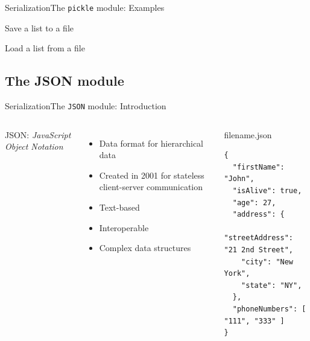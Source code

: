 \documentclass[10pt,compress]{beamer} %
\begin{document}
\begin{frame}[fragile]{Serialization}{The \texttt{pickle} module: Examples}
	\begin{exampleblock}{Save a list  to a file}
	\vspace{-0.2cm}
	
	\vspace{-0.2cm}
	\end{exampleblock}

	\begin{exampleblock}{Load a list from a file}
	\vspace{-0.2cm}
	
	\vspace{-0.2cm}
	\end{exampleblock}
\end{frame}

\subsection{The JSON module}

\begin{frame}[fragile]{Serialization}{The \texttt{JSON} module: Introduction}
	\begin{columns}
		JSON: \textit{JavaScript Object Notation}
		\begin{itemize}
		\item Data format for hierarchical data
        	\item Created in 2001 for stateless client-server communication
	        \item Text-based
		\item Interoperable
	        \item Complex data structures
		\end{itemize}

        \begin{exampleblock}{filename.json}
		\begin{lstlisting}[basicstyle=\scriptsize]
{
  "firstName": "John",
  "isAlive": true,
  "age": 27,
  "address": {
    "streetAddress": "21 2nd Street",
    "city": "New York",
    "state": "NY",
  },
  "phoneNumbers": [ "111", "333" ]
}
\end{lstlisting}
        \end{exampleblock}
	\end{columns}
\end{frame}
\end{document}
